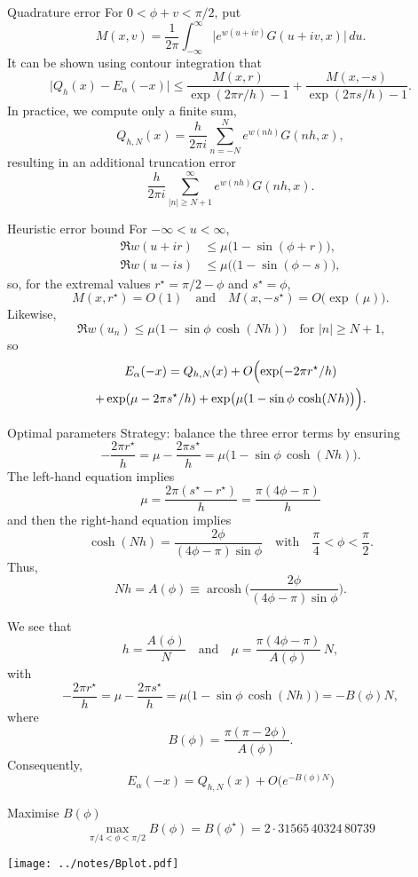 \documentclass{beamer}
\begin{document}
\begin{frame}{Quadrature error}
For $0<\phi+v<\pi/2$, put
\[
M(x,v)=\frac{1}{2\pi}\int_{-\infty}^\infty\bigl|e^{w(u+iv)}G(u+iv,x)\bigr|\,du.
\]
It can be shown using contour integration that
\[
\bigl|Q_h(x)-E_\alpha(-x)\bigr|\le\frac{M(x,r)}{\exp(2\pi r/h)-1}
	+\frac{M(x,-s)}{\exp(2\pi s/h)-1}.
\]
In practice, we compute only a finite sum,
\[
Q_{h,N}(x)=\frac{h}{2\pi i}\sum_{n=-N}^N e^{w(nh)}G(nh,x),
\]
resulting in an additional truncation error
\[
\frac{h}{2\pi i}\sum_{|n|\ge N+1}^\infty e^{w(nh)}G(nh,x).
\]
\end{frame}
\begin{frame}{Heuristic error bound}
For $-\infty<u<\infty$,
\begin{align*}
\Re w(u+ir)&\le\mu\bigl(1-\sin(\phi+r)\bigr),\\
\Re w(u-is)&\le\mu(\bigl(1-\sin(\phi-s)\bigr),
\end{align*}
so, for the extremal values $r^\star=\pi/2-\phi$ and $s^\star=\phi$, 
\[
M(x,r^\star)=O(1)\quad\text{and}\quad M(x,-s^\star)=O\bigl(\exp(\mu)\bigr).
\]
Likewise,
\[
\Re w(u_n)\le\mu\bigl(1-\sin\phi\,\cosh(Nh)\bigr)
\quad\text{for $|n|\ge N+1$,}
\]
so
\begin{multline*}
E_\alpha(-x)=Q_{h,N}(x)+O\Bigl(\exp(-2\pi r^\star/h)\\
	+\exp(\mu-2\pi s^\star/h)
	+\exp\bigl(\mu(1-\sin\phi\,\cosh(Nh)\bigr)\Bigr).
\end{multline*}
\end{frame}
\begin{frame}{Optimal parameters}
Strategy: balance the three error terms by ensuring
\[
-\frac{2\pi r^\star}{h}=\mu-\frac{2\pi s^\star}{h}
	=\mu\bigl(1-\sin\phi\,\cosh(Nh)\bigr).
\]
The left-hand equation implies
\[
\mu=\frac{2\pi(s^\star-r^\star)}{h}=\frac{\pi(4\phi-\pi)}{h}
\]
and then the right-hand equation implies
\[
\cosh(Nh)=\frac{2\phi}{(4\phi-\pi)\sin\phi}
\quad\text{with}\quad\frac{\pi}{4}<\phi<\frac{\pi}{2}.
\]
Thus,
\[
Nh=A(\phi)\equiv\operatorname{arcosh}\biggl(
	\frac{2\phi}{(4\phi-\pi)\sin\phi}\biggr).
\]
\end{frame}
\begin{frame}
We see that
\[
h=\frac{A(\phi)}{N}\quad\text{and}\quad
\mu=\frac{\pi(4\phi-\pi)}{A(\phi)}\,N,
\]
with
\[
-\frac{2\pi r^\star}{h}=\mu-\frac{2\pi s^\star}{h}
	=\mu\bigl(1-\sin\phi\,\cosh(Nh)\bigr)=-B(\phi)N,
\]
where
\[
B(\phi)=\frac{\pi(\pi-2\phi)}{A(\phi)}.
\]
Consequently,
\[
E_\alpha(-x)=Q_{h,N}(x)+O\bigl(e^{-B(\phi)N}\bigr)
\]
\end{frame}
\begin{frame}{Maximise $B(\phi)$}
\[
\max_{\pi/4<\phi<\pi/2}B(\phi)=B(\phi^\star)=2{\cdot}31565\,40324\,80739
\]
\vfill
\begin{center}
\texttt{[image: ../notes/Bplot.pdf]}
\end{center}
\end{frame}
\end{document}
